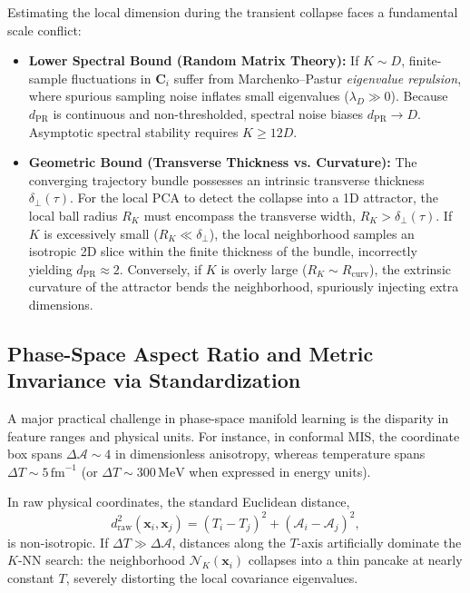 Estimating the local dimension during the transient collapse faces a fundamental scale conflict:
\begin{itemize}
    \item \textbf{Lower Spectral Bound (Random Matrix Theory):} If $K \sim D$, finite-sample fluctuations in $\mathbf{C}_i$ suffer from Marchenko--Pastur \emph{eigenvalue repulsion}, where spurious sampling noise inflates small eigenvalues ($\lambda_D \gg 0$). Because $d_{\mathrm{PR}}$ is continuous and non-thresholded, spectral noise biases $d_{\mathrm{PR}} \to D$. Asymptotic spectral stability requires $K \ge 12 D$.
    \item \textbf{Geometric Bound (Transverse Thickness vs. Curvature):} The converging trajectory bundle possesses an intrinsic transverse thickness $\delta_\perp(\tau)$. For the local PCA to detect the collapse into a 1D attractor, the local ball radius $R_K$ must encompass the transverse width, $R_K > \delta_\perp(\tau)$. If $K$ is excessively small ($R_K \ll \delta_\perp$), the local neighborhood samples an isotropic 2D slice within the finite thickness of the bundle, incorrectly yielding $d_{\mathrm{PR}} \approx 2$. Conversely, if $K$ is overly large ($R_K \sim R_{\mathrm{curv}}$), the extrinsic curvature of the attractor bends the neighborhood, spuriously injecting extra dimensions.
\end{itemize}

\subsection{Phase-Space Aspect Ratio and Metric Invariance via Standardization}
\label{subsec:data_range_standardization}
A major practical challenge in phase-space manifold learning is the disparity in feature ranges and physical units. For instance, in conformal MIS, the coordinate box spans $\Delta \mathcal{A} \sim 4$ in dimensionless anisotropy, whereas temperature spans $\Delta T \sim 5\,\mathrm{fm}^{-1}$ (or $\Delta T \sim 300\,\mathrm{MeV}$ when expressed in energy units). 

In raw physical coordinates, the standard Euclidean distance,
\begin{equation}
    d_{\mathrm{raw}}^2(\mathbf{x}_i, \mathbf{x}_j) = (T_i - T_j)^2 + (\mathcal{A}_i - \mathcal{A}_j)^2,
\end{equation}
is non-isotropic. If $\Delta T \gg \Delta \mathcal{A}$, distances along the $T$-axis artificially dominate the $K$-NN search: the neighborhood $\mathcal{N}_K(\mathbf{x}_i)$ collapses into a thin pancake at nearly constant $T$, severely distorting the local covariance eigenvalues.

